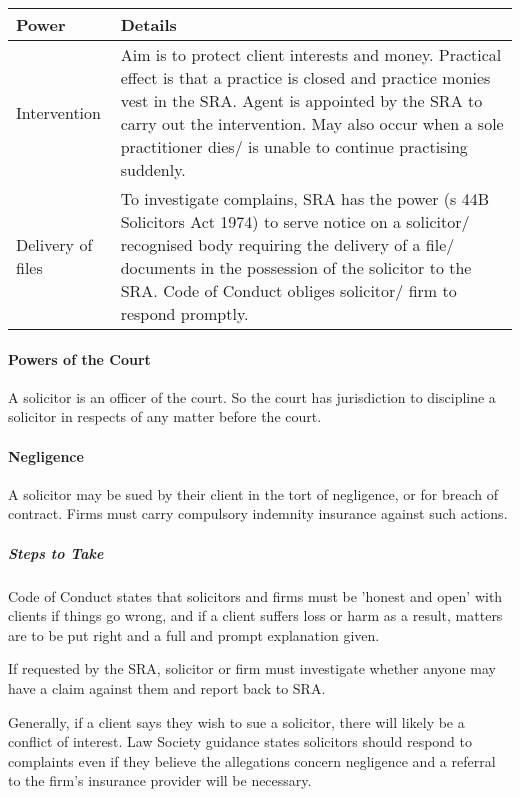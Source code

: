 \documentclass[
]{article}
\begin{document}
\begin{longtable}[]{@{}ll@{}}
\toprule()
Power & Details \\
\midrule()
\endhead
Intervention & Aim is to protect client interests and money. Practical
effect is that a practice is closed and practice monies vest in the SRA.
Agent is appointed by the SRA to carry out the intervention. May also
occur when a sole practitioner dies/ is unable to continue practising
suddenly. \\
Delivery of files & To investigate complains, SRA has the power (s 44B
Solicitors Act 1974) to serve notice on a solicitor/ recognised body
requiring the delivery of a file/ documents in the possession of the
solicitor to the SRA. Code of Conduct obliges solicitor/ firm to respond
promptly. \\
\bottomrule()
\end{longtable}

\hypertarget{powers-of-the-court}{%
\paragraph{Powers of the Court}\label{powers-of-the-court}}

A solicitor is an officer of the court. So the court has jurisdiction to
discipline a solicitor in respects of any matter before the court.

\hypertarget{negligence}{%
\paragraph{Negligence}\label{negligence}}

A solicitor may be sued by their client in the tort of negligence, or
for breach of contract. Firms must carry compulsory indemnity insurance
against such actions.

\hypertarget{steps-to-take}{%
\subparagraph{Steps to Take}\label{steps-to-take}}

Code of Conduct states that solicitors and firms must be 'honest and
open' with clients if things go wrong, and if a client suffers loss or
harm as a result, matters are to be put right and a full and prompt
explanation given.

If requested by the SRA, solicitor or firm must investigate whether
anyone may have a claim against them and report back to SRA.

Generally, if a client says they wish to sue a solicitor, there will
likely be a conflict of interest. Law Society guidance states solicitors
should respond to complaints even if they believe the allegations
concern negligence and a referral to the firm's insurance provider will
be necessary.
\end{document}
